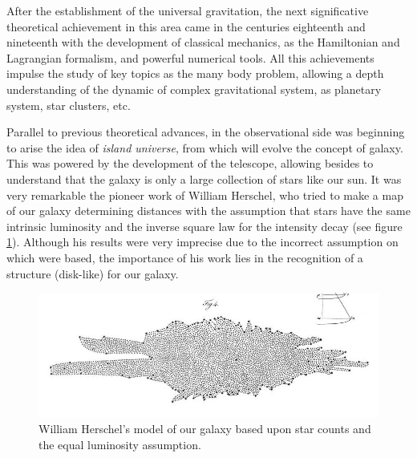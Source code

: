 After the establishment of the universal gravitation, the next significative 
theo\-retical achievement in this area came in the centuries eighteenth and 
nineteenth with the development of classical mechanics, as the Hamiltonian 
and Lagrangian formalism, and powerful numerical tools. All this achievements 
impulse the study of key topics as the many body problem, allowing a depth 
understanding of the dynamic of complex gravitational system, as planetary
system, star clusters, etc. 



Parallel to previous theoretical advances, in the observational side was 
beginning to arise the idea of \textit{island universe}, from which will 
evolve the concept of galaxy. This was powered by the development of the 
telescope, allowing besides to understand that the galaxy is only a large 
collection of stars like our sun. It was very remarkable the pioneer work of 
William Herschel, who tried to make a map of our galaxy determining distances 
with the assumption that stars have the same intrinsic luminosity and the 
inverse square law for the intensity decay (see figure \ref{fig:HerschelModel}). 
Although his results were very imprecise due to the incorrect assumption on 
which were based, the importance of his work lies in the recognition of a 
structure (disk-like) for our galaxy. 


\begin{figure}[htbp]
	\centering
	\includegraphics[width=1.0\textwidth]{./figures/1_introduction/Herschel_Model.png}
	
	\caption{\small{William Herschel's model of our galaxy based upon star 
	counts and the equal luminosity assumption.\cite{Herschel1785}}}
	
	\label{fig:HerschelModel}
\end{figure}


